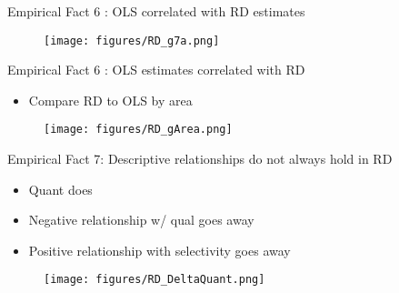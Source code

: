 \documentclass[table,10pt]{beamer}
\begin{document}
\begin{frame}{Empirical Fact 6 : OLS correlated with RD estimates}

\begin{center}
\begin{minipage}[f]{\textwidth}
\begin{figure}[H]
 \centering
\texttt{[image: figures/RD\_g7a.png]}
\end{figure}
\end{minipage}
\end{center}
\end{frame}

\begin{frame}{Empirical Fact 6 : OLS estimates correlated with RD}
\begin{itemize}
\item Compare RD to OLS  by area
\end{itemize}
\begin{center}
\begin{minipage}[f]{\textwidth}
\begin{figure}[H]
 \centering
\vspace{-.1in}
\texttt{[image: figures/RD\_gArea.png]}
\end{figure}
\end{minipage}
\end{center}

\end{frame}



\begin{frame}{Empirical Fact 7: Descriptive relationships do not always hold in RD}

\begin{itemize}
\item Quant does
\item Negative relationship w/ qual goes away
\item Positive relationship with selectivity goes away
\end{itemize}
\begin{center}
\begin{minipage}[f]{\textwidth}
\begin{figure}[H]
 \centering
\texttt{[image: figures/RD\_DeltaQuant.png]}
\end{figure}
\end{minipage}
\end{center}
\end{frame}
\end{document}

